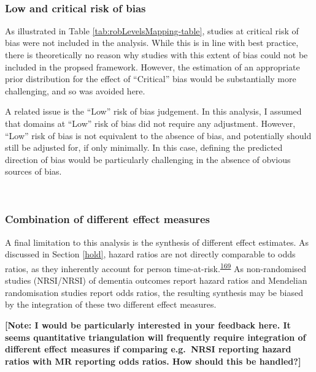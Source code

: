 \documentclass[a4paper, twoside]{templates/ociamthesis}
\begin{document}
~

\hypertarget{low-and-critical-risk-of-bias}{%
\subsubsection{Low and critical risk of bias}\label{low-and-critical-risk-of-bias}}

As illustrated in Table \ref{tab:robLevelsMapping-table}, studies at critical risk of bias were not included in the analysis. While this is in line with best practice, there is theoretically no reason why studies with this extent of bias could not be included in the propsed framework. However, the estimation of an appropriate prior distribution for the effect of ``Critical'' bias would be substantially more challenging, and so was avoided here.

A related issue is the ``Low'' risk of bias judgement. In this analysis, I assumed that domains at ``Low'' risk of bias did not require any adjustment. However, ``Low'' risk of bias is not equivalent to the absence of bias, and potentially should still be adjusted for, if only minimally. In this case, defining the predicted direction of bias would be particularly challenging in the absence of obvious sources of bias.

~

\hypertarget{combination-of-different-effect-measures}{%
\subsubsection{Combination of different effect measures}\label{combination-of-different-effect-measures}}

A final limitation to this analysis is the synthesis of different effect estimates. As discussed in Section \ref{hold}, hazard ratios are not directly comparable to odds ratios, as they inherently account for person time-at-risk.\textsuperscript{\protect\hyperlink{ref-mckenzie2019}{169}} As non-randomised studies (NRSI/NRSI) of dementia outcomes report hazard ratios and Mendelian randomisation studies report odds ratios, the resulting synthesis may be biased by the integration of these two different effect measures.

\textbf{{[}Note: I would be particularly interested in your feedback here. It seems quantitative triangulation will frequently require integration of different effect measures if comparing e.g.~NRSI reporting hazard ratios with MR reporting odds ratios. How should this be handled?{]}}
\end{document}
